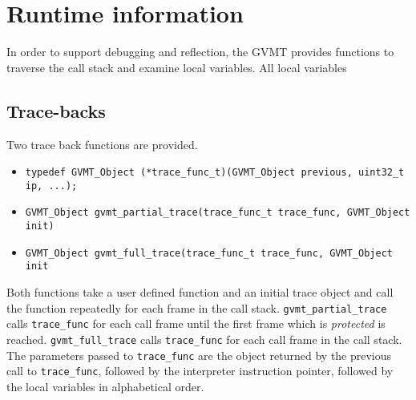 \documentclass[a4paper,10pt]{article}
\begin{document}
\section{Runtime information}
In order to support debugging and reflection, the GVMT provides functions to traverse the call stack and examine local variables.
All local variables 

\subsection{Trace-backs}
Two trace back functions are provided.
\begin{itemize}
\item [] \verb|typedef GVMT_Object (*trace_func_t)(GVMT_Object previous, uint32_t ip, ...);|
\item [] \verb|GVMT_Object gvmt_partial_trace(trace_func_t trace_func, GVMT_Object init)|
\item [] \verb|GVMT_Object gvmt_full_trace(trace_func_t trace_func, GVMT_Object init|
\end{itemize}
Both functions take a user defined function and an initial trace object and call the function repeatedly for each frame in the call stack.
\verb|gvmt_partial_trace| calls \verb|trace_func| for each call frame until the first frame which is \emph{protected} is reached.
\verb|gvmt_full_trace| calls \verb|trace_func| for each call frame in the call stack.
The parameters passed to \verb|trace_func| are the object returned by the previous call to \verb|trace_func|, followed by the interpreter instruction pointer, followed by the local variables in alphabetical order.
\end{document}
